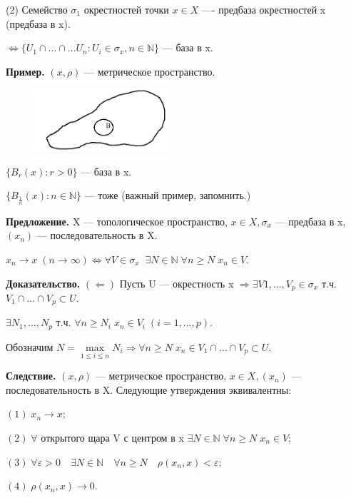\documentclass[12pt,a4paper]{article}
\begin{document}
(2) Семейство $\sigma_{1}$ окрестностей точки $x \in X$ ---- предбаза окрестностей x (предбаза в x). 

$\Leftrightarrow \{U_{1} \cap ... \cap... U_{n}: U_{i} \in \sigma_{x}, n \in \mathbb{N}\}$ --- база в x. 

\textbf{Пример.} $(x, \rho)$ --- метрическое пространство. 

\begin{figure}
	\includegraphics[width = 5cm]{lect3_4.png}
\end{figure}

$\{B_{r}(x): r > 0\}$ --- база в x. 

$\{B_{\frac{1}{n}}(x): n \in \mathbb{N}\}$ --- тоже (важный пример, запомнить.)

\textbf{Предложение.} X --- топологическое пространство, $x \in X, \sigma_{x}$ --- предбаза в x, $(x_{n})$ --- последовательность в X.

$x_{n} \to x \; (n \to \infty) \Leftrightarrow \forall V \in \sigma_{x} \; \; \exists N \in \mathbb{N} \; \forall n \geq N \; x_{n} \in V.$

\textbf{Доказательство.} $(\Leftarrow)$ Пусть U --- окрестность x $\Rightarrow \exists V{1}, ..., V_{p} \in \sigma_{x}$ т.ч. $V_{1} \cap ... \cap V_{p} \subset U.$ 

$\exists N_{1}, ..., N_{p}$ т.ч. $\forall n \geq N_{i} \; x_{n} \in V_{i} \; (i = 1, ..., p).$

Обозначим $N = \underset{1 \leq i \leq n}{\max} N_{i} \Rightarrow \forall n \geq N \; x_{n} \in V_{1} \cap ... \cap V_{p} \subset U.$ 


\textbf{Следствие.} $(x, \rho)$ --- метрическое пространство, $x \in X, (x_{n})$ --- последовательность в X. Следующие утверждения эквивалентны: 

$(1) \; x_{n} \to x;$

$(2) \; \forall$ открытого щара V с центром в x $\exists N \in \mathbb{N} \; \forall n \geq N\; x_{n} \in V;$

$(3) \; \forall \varepsilon > 0 \quad \exists N \in \mathbb{N} \quad \forall n \geq N \quad \rho(x_{n}, x) < \varepsilon;$

$(4) \; \rho(x_{n}, x) \to 0.$
\end{document}
